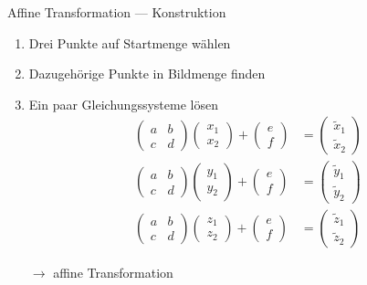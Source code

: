 \documentclass[10pt]{beamer}
\begin{document}
\begin{frame}{Affine Transformation --- Konstruktion}
  \begin{enumerate}
    \item Drei Punkte auf Startmenge wählen
    \item Dazugehörige Punkte in Bildmenge finden
    \item Ein paar Gleichungssysteme lösen
    \begin{align*}
      \left( \begin{smallmatrix}
        a & b \\ c & d
      \end{smallmatrix} \right) \left( \begin{smallmatrix}
        x_1 \\ x_2
      \end{smallmatrix} \right) + \left( \begin{smallmatrix}
        e \\ f
      \end{smallmatrix} \right) &= \left( \begin{smallmatrix}
        \widetilde{x}_1 \\ \widetilde{x}_2
      \end{smallmatrix} \right) \\
      \left( \begin{smallmatrix}
        a & b \\ c & d
      \end{smallmatrix} \right) \left( \begin{smallmatrix}
        y_1 \\ y_2
      \end{smallmatrix} \right) + \left( \begin{smallmatrix}
        e \\ f
      \end{smallmatrix} \right) &= \left( \begin{smallmatrix}
        \widetilde{y}_1 \\ \widetilde{y}_2
      \end{smallmatrix} \right) \\
      \left( \begin{smallmatrix}
        a & b \\ c & d
      \end{smallmatrix} \right) \left( \begin{smallmatrix}
        z_1 \\ z_2
      \end{smallmatrix} \right) + \left( \begin{smallmatrix}
        e \\ f
      \end{smallmatrix} \right) &= \left( \begin{smallmatrix}
        \widetilde{z}_1 \\ \widetilde{z}_2
      \end{smallmatrix} \right)
    \end{align*}
    \item[\( \to \)] \alert{affine Transformation}
  \end{enumerate}
\end{frame}
\end{document}
